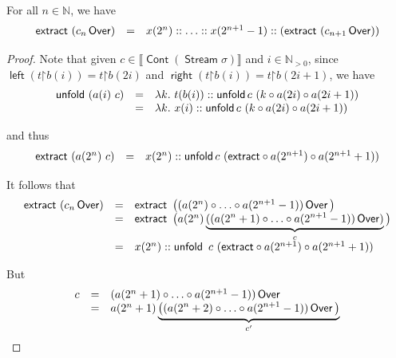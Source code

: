 \documentclass[%
  a4paper,
  UKenglish,
  cleveref,
  autoref,
  thm-restate,
  numberwithinsect,
]{lipics-v2021}
\newcommand\restr{\mathord{\upharpoonright}}	%
\newcommand\NN{\mathbb{N}}
\newcommand\I[1]{\llbracket #1 \rrbracket} %
\newcommand\comp{\mathbin\circ}
\newcommand\term[1]{\mathsf{#1}}
\newcommand\type[1]{\term{#1}}
\newcommand\unfold{\mathop{\term{unfold}}}
\newcommand\Colon{\mathrel{::}}
\newcommand\lft{\mathop{\term{left}}}
\newcommand\rght{\mathop{\term{right}}}
\newcommand\extract{\mathop{\term{extract}}}
\newcommand\Over{\mathop{\term{Over}}}
\newcommand\Stream{\mathop{\type{Stream}}}
\newcommand\Cont{\mathop{\type{Cont}}}
\newcommand\PTbis{\sigma}	%
\begin{document}
\begin{lemma}
\label{lem:proof:sem:stream-tree}
For all $n \in \NN$, we have
\[
\begin{array}{r c l}
  \extract\ (c_n \Over)
& =
& x(2^n) \Colon \ldots \Colon x(2^{n+1}-1) \Colon
  (\extract\ (c_{n+1} \Over))
\end{array}
\]
\end{lemma}

\begin{proof}
Note that given $c \in \I{\Cont(\Stream\PTbis)}$
and $i \in \NN_{>0}$,
since
$\lft(t \restr b(i)) = t \restr b(2i)$
and
$\rght(t \restr b(i)) = t \restr b(2i+1)$,
we have
\[
\begin{array}{r c l}
  \unfold\ (a(i)\ c)
& =
& \lambda k.~
  t(b(i)) \Colon
  \unfold c\ (k \comp a(2i) \comp a(2i+1))
\\
& =
& \lambda k.~
  x(i) \Colon
  \unfold c\ (k \comp a(2i) \comp a(2i+1))
\end{array}
\]

\noindent
and thus
\[
\begin{array}{r c l}
  \extract\ (a(2^n)\ c)
& =
& x(2^n) \Colon
  \unfold c\ ({\extract} \comp {a(2^{n+1})} \comp a(2^{n+1}+1))
\end{array}
\]

\noindent
It follows that
\[
\begin{array}{l l l}
  \extract\ (c_n \Over)
& =
& \extract\ \big( (a(2^n) \comp \dots \comp a(2^{n+1}-1)) \Over \big)
\\
%
& =
& \extract\
  \big( a(2^n) \underbrace{((a(2^n+1) \comp \dots \comp a(2^{n+1}-1)) \Over)}_c \big)
\\
%
& =
& x(2^n) \Colon
  \unfold\ c\ ({\extract} \comp {a(2^{n+1})} \comp a(2^{n+1}+1))
\end{array}
\]

\noindent
But
\[
\begin{array}{l l l}
  c
& =
& (a(2^n+1) \comp \dots \comp a(2^{n+1}-1)) \Over
\\
%
& =
& a(2^n+1)
  \underbrace{\big( (a(2^n+2) \comp \dots \comp a(2^{n+1}-1)) \Over \big)}_{c'}
\end{array}
\]


\end{proof}
\end{document}

